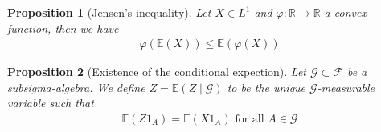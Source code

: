 \documentclass[11pt,a4paper, final]{article}
\newtheorem{prop}{Proposition}[section]
\theoremstyle{definition}
\begin{document}
\begin{prop}[Jensen's inequality] Let $X \in L^1$ and $\varphi: \mathbb{R} \to \mathbb{R}$ a convex function, then we have 
\begin{align*}
\varphi( \mathbb{E}(X)) \leq \mathbb{E}( \varphi(X))
\end{align*}
\end{prop}
\begin{prop}[Existence of the conditional expection] Let $\mathcal{G} \subset \mathcal{F}$ be a subsigma-algebra. We define $Z= \mathbb{E}(Z \mid \mathcal{G})$ to be the unique $\mathcal{G}$-measurable variable such that 
\begin{align*}
\mathbb{E}(Z 1_A) = \mathbb{E}(X 1_A) \text{ for all } A \in \mathcal{G}
\end{align*}
\end{prop}
\newpage
\end{document}
